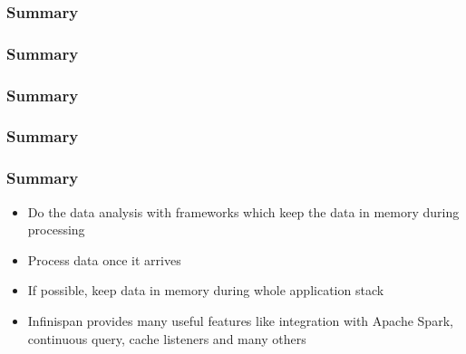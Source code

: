 \documentclass[10pt,utf8]{beamer}
\begin{document}
\begin{frame}
	\frametitle{Summary}
	\vspace{3cm}
	\vspace{3cm}
\end{frame}

\begin{frame}
	\frametitle{Summary}
	\vspace{3cm}
	\vspace{3cm}
\end{frame}

\begin{frame}
	\frametitle{Summary}
	\vspace{3cm}
	\vspace{3cm}
\end{frame}

\begin{frame}
	\frametitle{Summary}
	\vspace{3cm}
	\vspace{3cm}
\end{frame}


\begin{frame}
	\frametitle{Summary}
	\begin{itemize}
		\item Do the data analysis with frameworks which keep the data in memory during processing
		\item Process data once it arrives
		\item If possible, keep data in memory during whole application stack
		\item Infinispan provides many useful features like integration with Apache Spark, continuous query, cache listeners and many others
	\end{itemize}
\end{frame}
\end{document}
